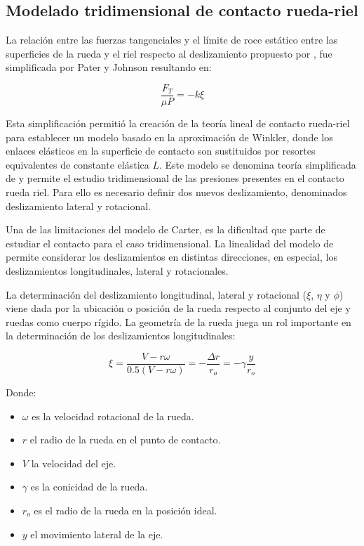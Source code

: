 \documentclass[main]{subfiles}
\begin{document}
 
\subsection{Modelado tridimensional de contacto rueda-riel} 
 
La relación entre las fuerzas tangenciales y el límite de roce estático entre las superficies de la rueda y el riel respecto al deslizamiento propuesto por \citet{Carter1926}, fue simplificada por Pater y Johnson resultando en:

  \begin{equation}
  \label{eq:Eq13}
  \frac{F_T}{\mu P}=-k\xi
  \end{equation}

Esta simplificación permitió la creación de la teoría lineal de contacto rueda-riel para establecer un modelo basado en la
aproximación de Winkler, donde los enlaces elásticos en la superficie de contacto son sustituidos por resortes equivalentes de constante elástica $L$. Este modelo se denomina teoría simplificada de \citet{Kalker1971VSD} y permite el estudio tridimensional de las presiones presentes en el contacto rueda riel. Para ello es necesario definir dos nuevos deslizamiento, denominados deslizamiento lateral y rotacional.

Una de las limitaciones del modelo de Carter, es la dificultad que parte de estudiar el contacto para el caso tridimensional. La linealidad del modelo de \citet{Kalker1971VSD} permite considerar los deslizamientos en distintas direcciones, en especial, los deslizamientos longitudinales, lateral y rotacionales.

La determinación del deslizamiento longitudinal, lateral y rotacional ($\xi$, $\eta$ y $\phi$) viene dada por la ubicación o posición de la rueda respecto al conjunto del eje y ruedas como cuerpo rígido. La geometría de la rueda juega un rol importante en la determinación de los deslizamientos longitudinales:

\begin{equation}
\label{DezlLong}
\xi=\frac{V-r\omega}{0.5(V-r\omega)}=-\frac{\Delta r}{r_o}=-\gamma\frac{y}{r_o}
\end{equation}

\par \hspace{1cm}
\begin{minipage}{10cm}
\begin{spacing}{0.5}
Donde:
\begin{itemize}
\item $\omega$ es la velocidad rotacional de la rueda.
\item $r$ el radio de la rueda en el punto de contacto.
\item $V$ la velocidad del eje.
\item $\gamma$ es la conicidad de la rueda.
\item $r_o$ es el radio de la rueda en la posición ideal.
\item $y$ el movimiento lateral de la eje.
\end{itemize}
\end{spacing}
\end{minipage}
\end{document}
